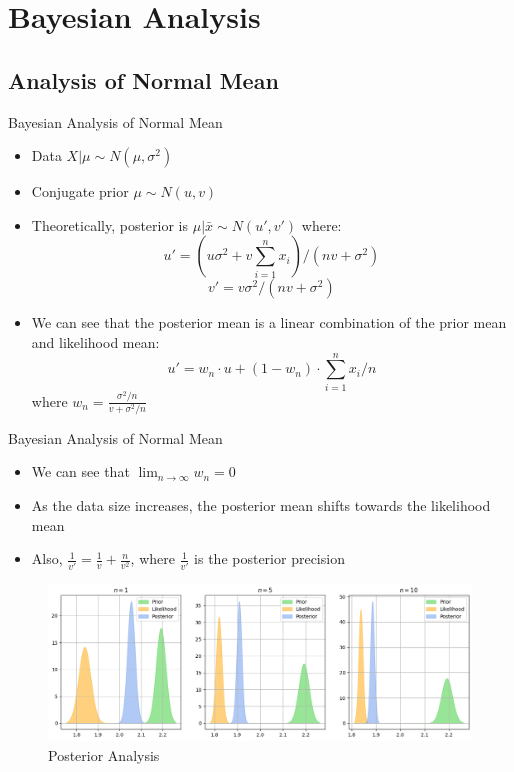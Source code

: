 \section{Bayesian Analysis}


\subsection{Analysis of Normal Mean}

\begin{frame}{Bayesian Analysis of Normal Mean}

  \begin{itemize}
    \item Data $X | \mu \sim N(\mu, \sigma^2)$
    \item Conjugate prior $\mu \sim N(u, v)$
    \item Theoretically, posterior is $\mu | \bar{x} \sim N(u', v')$ where:
    \[ u' = \left(u \sigma^2 + v \sum_{i = 1}^{n} x_i\right) / (n v + \sigma^2) \]
    \[ v' = v \sigma^2/(n v + \sigma^2) \]
    \item We can see that the posterior mean is a linear combination of the prior mean and likelihood mean:
    \[ u' = w_n \cdot u + (1 - w_n) \cdot \sum_{i = 1}^{n} x_i / n \]
    where $w_n = \frac{\sigma^2 / n}{v + \sigma^2 / n}$
  \end{itemize}
  
\end{frame}

\begin{frame}{Bayesian Analysis of Normal Mean}

  \begin{itemize}
    \item We can see that $\lim_{n \to \infty} w_n = 0$
    \item As the data size increases, the posterior mean shifts towards the likelihood mean
    \item Also, $\frac{1}{v'} = \frac{1}{v} + \frac{n}{v^2}$, where $\frac{1}{v'}$ is the posterior precision
  \end{itemize}

  \begin{figure}
    \centering
    \includegraphics[width=\textwidth]{../Report/images/posterior.png}
    \caption{Posterior Analysis}
  \end{figure}

\end{frame}


